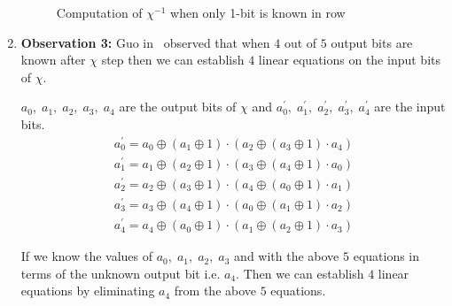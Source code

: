 \begin{enumerate}
\begin{figure}[ht]
\begin{center}
\end{center}
\caption{Computation of $\chi^{-1}$ when only 1-bit is known in row \label{chi_inv2}}
\end{figure}

\item \label{ob3}\textbf{Observation 3:} Guo \etal in~\cite{guo2016linear} observed that when $4$ out of $5$ output bits are known after $\chi$ step then we can establish $4$ linear equations on the input bits of $\chi$.

$a_0,\;a_1,\; a_2,\; a_3,\; a_4$ are the output bits of $\chi$ and $a_0^\prime, 
\;a_1^\prime,\; a_2^\prime, \;a_3^\prime,\; a_4^\prime$ are the input bits.
\begin{align}\label{eq:a0}
a_0^\prime = a_0 \oplus \left( a_{1} \oplus 1\right) \cdot \left( a_{2} \oplus \left( a_{3} \oplus 1 \right) \cdot a_{4}\right)
\end{align}
\begin{align}\label{eq:a1}
a_1^\prime = a_1 \oplus \left( a_{2} \oplus 1\right) \cdot \left( a_{3} \oplus \left( a_{4} \oplus 1 \right) \cdot a_{0}\right)
\end{align}
\begin{align}\label{eq:a2}
a_2^\prime = a_2 \oplus \left( a_{3} \oplus 1\right) \cdot \left( a_{4} \oplus \left( a_{0} \oplus 1 \right) \cdot a_{1}\right)
\end{align}
\begin{align}\label{eq:a3}
a_3^\prime = a_3 \oplus \left( a_{4} \oplus 1\right) \cdot \left( a_{0} \oplus \left( a_{1} \oplus 1 \right) \cdot a_{2}\right)
\end{align}
\begin{align}\label{eq:a4}
a_4^\prime = a_4 \oplus \left( a_{0} \oplus 1\right) \cdot \left( a_{1} \oplus \left( a_{2} \oplus 1 \right) \cdot a_{3}\right)
\end{align}

If we know the values of $a_0,\; a_1,\; a_2,\; a_3$ and with the above $5$ equations in terms of the unknown output bit i.e. $a_4$. Then we can establish $4$ linear equations by eliminating $a_4$ from the above $5$ equations.


\end{enumerate}
